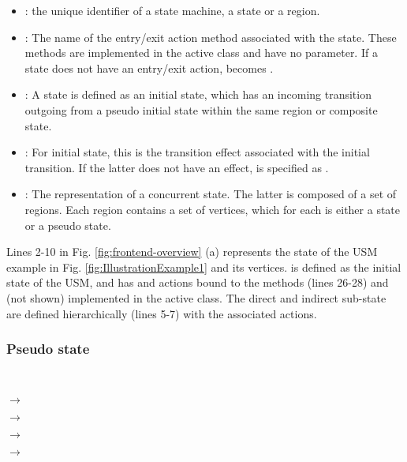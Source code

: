 \noindent
{}
\begin{itemize}
	\item {}: the unique identifier of a state machine, a state or a region.
	
	\item {}: The name of the entry/exit action method associated with the state. 
	These methods are implemented in the active class and have no parameter.
	If a state does not have an entry/exit action,  becomes .
	
	\item {}: A state is defined as an initial state, which has an incoming transition outgoing from a pseudo initial state within the same region or composite state. 
	
	\item {}: For initial state, this is the transition effect associated with the initial transition.
	If the latter does not have an effect,  is specified as .
	
	\item {}: The representation of a concurrent state. 
	The latter is composed of a set of regions.
	Each region contains a set of vertices, which for each is either a state or a pseudo state.
\end{itemize}

\noindent
{}
Lines 2-10 in Fig. \ref{fig:frontend-overview} (a) represents the state  of the USM example in Fig. \ref{fig:IllustrationExample1} and its vertices.
 is defined as the initial state of the USM, and has  and  actions bound to the methods  (lines 26-28) and  (not shown) implemented in the active class.
The direct  and indirect  sub-state are defined hierarchically (lines 5-7) with the associated actions.

\subsubsection{Pseudo state} ~\\

 $\rightarrow$  

 $\rightarrow$ 

 $\rightarrow$ 

 $\rightarrow$ 

